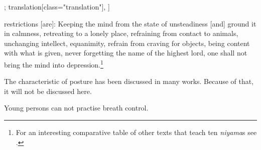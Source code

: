 \begin{alignment}[
  texts=edition[class="edition"];
  translation[class="translation"],
  ]
\begin{translation}
\begin{tlate}[p31_01]
[The] restrictions [are]: Keeping the mind from the state of unsteadiness [and] ground it in calmness, retreating to a lonely place, refraining from contact to animals, unchanging intellect, equanimity, refrain from craving for objects, being content with what is given, never forgetting the name of the highest lord, one shall not bring the mind into depression.\footnote{For an interesting comparative table of other texts that teach ten \textit{niyama}s see \citeauthor[2023:196]{shivayogapradipika}.}

The characteristic of posture has been discussed in many works. Because of that, it will not be discussed here.

Young persons can not practise breath control.
\end{tlate}
\end{translation}
\end{alignment}
\pagebreak %
